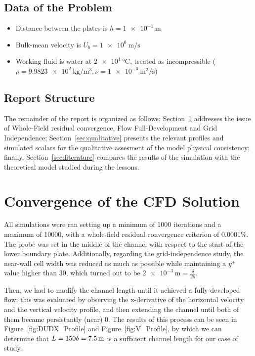 \documentclass[12pt]{article}
\begin{document}
        \subsection{Data of the Problem}

                \begin{itemize}
                        \item Distance between the plates is \( h = \SI{1e-1}{\metre} \)
                        \item Bulk-mean velocity is \( U_b = \SI{1e0}{\metre \per \second} \)
                        \item Working fluid is water at \( \SI{2e1}{\celsius} \), treated as incompressible (\( \rho = \SI{9.9823e2}{\kilogram \per \metre \cubed} , \nu = \SI{1e-6}{\metre \squared \per \second} \))
                \end{itemize}
        
        \subsection{Report Structure}

                The remainder of the report is organized as follows: Section~\ref{sec:convergence} addresses the issue of Whole-Field residual convergence, Flow Full-Development and Grid Independence; Section~\ref{sec:qualitative} presents the relevant profiles and simulated scalars for the qualitative assesment of the model physical consistency; finally, Section~\ref{sec:literature} compares the results of the simulation with the theoretical model studied during the lessons.

\section{Convergence of the CFD Solution} \label{sec:convergence}

        All simulations were ran setting up a minimum of 1000 iterations and a maximum of 10000, with a whole-field residual convergence criterion of 0.0001\%. The probe was set in the middle of the channel with respect to the start of the lower boundary plate. Additionally, regarding the grid-independence study, the near-wall cell width was reduced as much as possible while maintaining a \( y^+ \) value higher than 30, which turned out to be \( \SI{2e-3}{\metre} = \frac{\delta}{25} \).

        Then, we had to modify the channel length until it achieved a fully-developed flow; this was evaluated by observing the x-derivative of the horizontal velocity and the vertical velocity profile, and then extending the channel until both of them became persistantly (near) 0. The results of this process can be seen in Figure~\ref{fig:DUDX_Profile} and Figure~\ref{fig:V_Profile}, by which we can determine that $ L = 150 \delta =  \SI{7.5E0}{\metre}$ is a sufficient channel length for our case of study.
\end{document}
